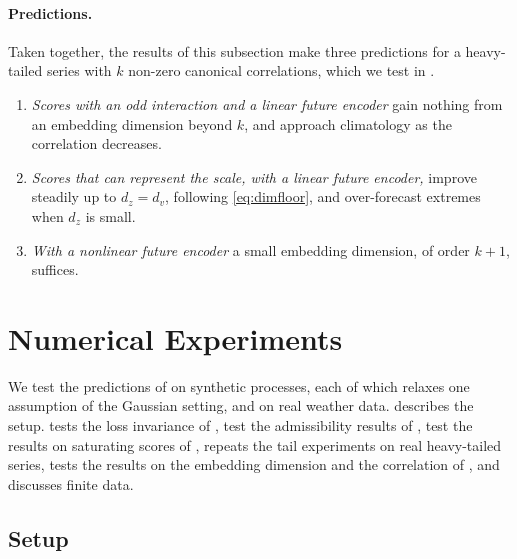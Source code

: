 \documentclass[11pt]{article}
\theoremstyle{plain}
\theoremstyle{definition}
\theoremstyle{remark}
\begin{document}
\paragraph{Predictions.}
Taken together, the results of this subsection make three predictions for a
heavy-tailed series with $k$ non-zero canonical correlations, which we test
in .
\begin{enumerate}[label=(D\arabic*),ref=D\arabic*]
 \item \label{D1} \emph{Scores with an odd interaction and a linear future
       encoder} gain nothing from an embedding dimension beyond $k$, and
       approach climatology as the correlation decreases.
 \item \label{D2} \emph{Scores that can represent the scale, with a linear
       future encoder,} improve steadily up to $d_z=d_v$, following
       \eqref{eq:dimfloor}, and over-forecast extremes when $d_z$ is small.
 \item \label{D3} \emph{With a nonlinear future encoder} a small embedding
       dimension, of order $k+1$, suffices.
\end{enumerate}

\section{Numerical Experiments}
\label{sec:experiments}

We test the predictions of  on synthetic
processes, each of which relaxes one assumption of the Gaussian setting, and
on real weather data.  describes the setup.
 tests the loss invariance of
,  test the
admissibility results of ,
 test the results
on saturating scores of ,
 repeats the tail experiments on real heavy-tailed
series,  tests the results on the embedding dimension and
the correlation of , and  discusses
finite data.

\subsection{Setup}
\label{ssec:setup}
\end{document}

